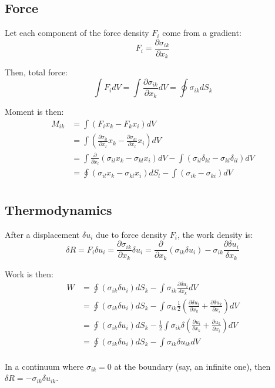 \documentclass[a4paper, 12pt]{report}
\begin{document}
\subsection{Force}
Let each component of the force density $F_i$ come from a gradient:
\begin{equation}
F_i = \frac{\partial\sigma_{ik}}{\partial x_k}
\end{equation}

Then, total force:
\begin{equation}
\int F_i dV = \int \frac{\partial\sigma_{ik}}{\partial x_k} dV = \oint\sigma_{ik} dS_k
\end{equation}

Moment is then:
\begin{equation}
\begin{array}{ll}
M_{ik} &= \displaystyle\int\left(F_i x_k - F_k x_i\right) dV \\
&= \displaystyle\int\left(\frac{\partial\sigma_{il}}{\partial x_l} x_k - \frac{\partial\sigma_{kl}}{\partial x_l} x_i\right) dV \\
&= \displaystyle\int\frac{\partial}{\partial x_l}\left(\sigma_{il} x_k - \sigma_{kl} x_i\right) dV - \int\left(\sigma_{il}\delta_{kl} - \sigma_{kl}\delta_{il}\right) dV \\
&= \displaystyle\oint\left(\sigma_{il} x_k - \sigma_{kl} x_i\right) dS_l - \int\left(\sigma_{ik} - \sigma_{ki}\right) dV \\
\end{array}
\end{equation}


\subsection{Thermodynamics}
After a displacement $\delta u_i$ due to force density $F_i$, the work density is:
\begin{equation}
\delta R = F_i\delta u_i
= \frac{\partial\sigma_{ik}}{\partial x_k}\delta u_i
= \frac{\partial}{\partial x_k}\left(\sigma_{ik}\delta u_i\right) - \sigma_{ik}\frac{\partial\delta u_i}{\delta x_k}
\end{equation}

Work is then:
\begin{equation}
\begin{array}{ll}
W &= \displaystyle \oint\left(\sigma_{ik}\delta u_i\right) dS_k - \int\sigma_{ik}\frac{\partial\delta u_i}{\delta x_k} dV \\
&= \displaystyle \oint\left(\sigma_{ik}\delta u_i\right) dS_k - \int\sigma_{ik}\frac{1}{2}\left(\frac{\partial\delta u_i}{\partial x_k} + \frac{\partial\delta u_k}{\partial x_i}\right) dV \\
&= \displaystyle \oint\left(\sigma_{ik}\delta u_i\right) dS_k - \frac{1}{2}\int\sigma_{ik}\delta\left(\frac{\partial u_i}{\delta x_k} + \frac{\partial u_k}{\partial x_i}\right) dV \\
&= \displaystyle \oint\left(\sigma_{ik}\delta u_i\right) dS_k - \int\sigma_{ik}\delta u_{ik} dV \\
\end{array}
\end{equation}

In a continuum where $\sigma_{ik} = 0$ at the boundary (say, an infinite one), then $\delta R = -\sigma_{ik}\delta u_{ik}$.
\end{document}
